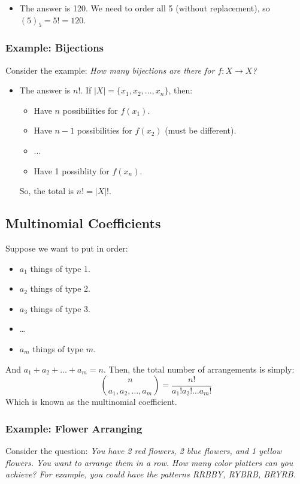 \documentclass[letterpaper]{article}
\begin{document}
\begin{itemize}
    \item The answer is 120. We need to order all 5 (without replacement), so $(5)_5 = 5! = 120$.
\end{itemize}

\subsubsection*{Example: Bijections}
Consider the example: \emph{How many bijections are there for $f: X \to X$?} 

\begin{itemize}
    \item The answer is $n!$. If $|X| = \{x_1, x_2, ..., x_n\}$, then:
    \begin{itemize}
        \item Have $n$ possibilities for $f(x_1)$.
        \item Have $n - 1$ possibilities for $f(x_2)$ (must be different).
        \item ... 
        \item Have 1 possiblity for $f(x_n)$.
    \end{itemize}
    So, the total is $n! = |X|!$. 
\end{itemize}

\subsection{Multinomial Coefficients}
Suppose we want to put in order:
\begin{itemize}
    \item $a_1$ things of type 1.
    \item $a_2$ things of type 2.
    \item $a_3$ things of type 3. 
    \item \dots
    \item $a_m$ things of type $m$.
\end{itemize}
And $a_1 + a_2 + \dots + a_m = n$. Then, the total number of arrangements is simply:
\[\binom{n}{a_1, a_2, \dots, a_m} = \frac{n!}{a_{1}!a_{2}! \dots a_{m}!}\]
Which is known as the multinomial coefficient.

\subsubsection{Example: Flower Arranging}
Consider the question: \emph{You have 2 red flowers, 2 blue flowers, and 1 yellow flowers. You want to arrange them in a row. How many color platters can you achieve? For example, you could have the patterns RRBBY, RYBRB, BRYRB.} 
\end{document}
